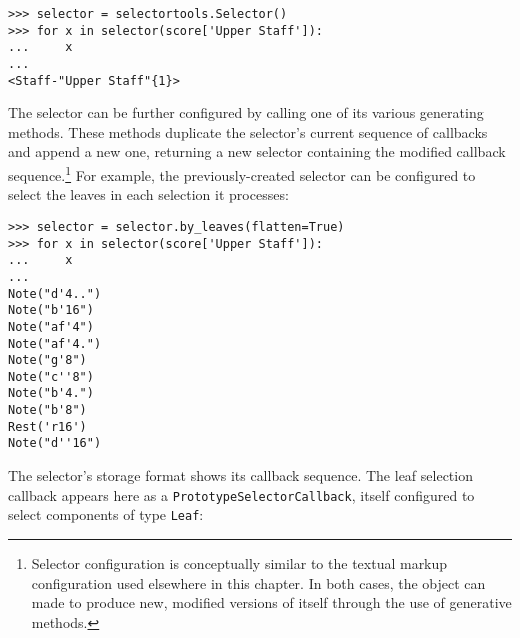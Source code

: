 \begin{comment}
<abjad>
selector = selectortools.Selector()
for x in selector(score['Upper Staff']):
    x

</abjad>
\end{comment}

\begin{abjadbookoutput}
\begin{singlespacing}
\vspace{-0.5\baselineskip}
\begin{verbatim}
>>> selector = selectortools.Selector()
>>> for x in selector(score['Upper Staff']):
...     x
...
<Staff-"Upper Staff"{1}>
\end{verbatim}
\end{singlespacing}
\end{abjadbookoutput}

\noindent The selector can be further configured by calling one of its various
generating methods. These methods duplicate the selector's current sequence of
callbacks and append a new one, returning a new selector containing the
modified callback sequence.\footnote{Selector configuration is conceptually
similar to the textual markup configuration used elsewhere in this chapter. In
both cases, the object can made to produce new, modified versions of itself
through the use of generative methods.} For example, the previously-created
selector can be configured to select the leaves in each selection it processes:

\begin{comment}
<abjad>
selector = selector.by_leaves(flatten=True)
for x in selector(score['Upper Staff']):
    x

</abjad>
\end{comment}

\begin{abjadbookoutput}
\begin{singlespacing}
\vspace{-0.5\baselineskip}
\begin{verbatim}
>>> selector = selector.by_leaves(flatten=True)
>>> for x in selector(score['Upper Staff']):
...     x
...
Note("d'4..")
Note("b'16")
Note("af'4")
Note("af'4.")
Note("g'8")
Note("c''8")
Note("b'4.")
Note("b'8")
Rest('r16')
Note("d''16")
\end{verbatim}
\end{singlespacing}
\end{abjadbookoutput}

\noindent The selector's storage format shows its callback sequence. The leaf
selection callback appears here as a \texttt{PrototypeSelectorCallback}, itself
configured to select components of type \texttt{Leaf}:

